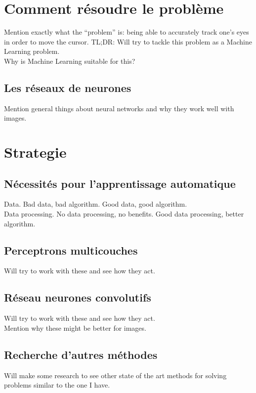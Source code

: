 \section{Comment résoudre le problème}
Mention exactly what the ``problem'' is: being able to accurately track one's eyes in order to move the cursor.
TL;DR: Will try to tackle this problem as a Machine Learning problem.\\
Why is Machine Learning suitable for this?\\
\subsection{Les réseaux de neurones}
Mention general things about neural networks and why they work well with images.\\

\section{Strategie}
\subsection{Nécessités pour l'apprentissage automatique}
Data. Bad data, bad algorithm. Good data, good algorithm.\\

Data processing. No data processing, no benefits. Good data processing, better algorithm.\\

\subsection{Perceptrons multicouches}
Will try to work with these and see how they act.\\

\subsection{Réseau neurones convolutifs}
Will try to work with these and see how they act.\\
Mention why these might be better for images.\\

\subsection{Recherche d'autres méthodes}
Will make some research to see other state of the art methods for solving problems similar to the one I have.\\